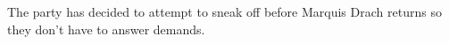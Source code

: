 The party has decided to attempt to sneak off before Marquis Drach returns so they don't have to answer demands.
